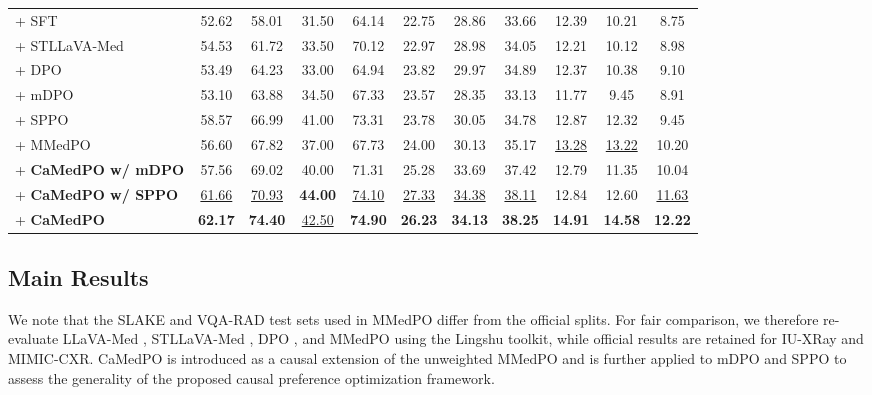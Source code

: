\begin{table}[t]
{\begin{tabular}{lcccccccccc}
\midrule
+ SFT & 52.62 & 58.01 & 31.50 & 64.14 & 22.75 & 28.86 & 33.66 & 12.39 & 10.21 & 8.75 \\
\quad+ STLLaVA-Med & 54.53 & 61.72 & 33.50 & 70.12 & 22.97 & 28.98 & 34.05 & 12.21 & 10.12 & 8.98 \\
\quad + DPO & 53.49 & 64.23 & 33.00 & 64.94 & 23.82 & 29.97 & 34.89 & 12.37 & 10.38 & 9.10 \\
\quad+ mDPO & 53.10 & 63.88 & 34.50 & 67.33 & 23.57 & 28.35 & 33.13 & 11.77 & 9.45 & 8.91 \\
\quad+ SPPO & 58.57 & 66.99 & 41.00 & 73.31 & 23.78 & 30.05 & 34.78 & 12.87 & 12.32 & 9.45 \\
\quad+ MMedPO & 56.60 & 67.82 & 37.00 & 67.73 & 24.00 & 30.13 & 35.17 & \underline{13.28} & \underline{13.22} & 10.20 \\
\rowcolor{cyan!7}
\quad+ \textbf{CaMedPO w/ mDPO} & 57.56 & 69.02 & 40.00 & 71.31 & 25.28 & 33.69 & 37.42 & 12.79 & 11.35 & 10.04 \\
\rowcolor{cyan!7}
\quad+ \textbf{CaMedPO w/ SPPO} & \underline{61.66} & \underline{70.93} & \textbf{44.00} & \underline{74.10} & \underline{27.33} & \underline{34.38} & \underline{38.11} & 12.84 & 12.60 & \underline{11.63} \\
\rowcolor{cyan!7}
\quad+ \textbf{CaMedPO} & \textbf{62.17} & \textbf{74.40} & \underline{42.50} & \textbf{74.90} & \textbf{26.23} & \textbf{34.13} & \textbf{38.25} & \textbf{14.91} & \textbf{14.58} & \textbf{12.22} \\
\bottomrule
\end{tabular}
}
\label{tab:main_results}
\end{table}

\subsection{Main Results}






We note that the SLAKE and VQA-RAD test sets used in MMedPO differ from the official splits. For fair comparison, we therefore re-evaluate LLaVA-Med \cite{Li2023LLaVAMed}, STLLaVA-Med \cite{sun2024stllava}, DPO \cite{rafailov2023direct}, and MMedPO \cite{Zhu2025MMedPO} using the Lingshu toolkit, while official results are retained for IU-XRay and MIMIC-CXR.
CaMedPO is introduced as a causal extension of the unweighted MMedPO and is further applied to mDPO \cite{wang2024mdpo} and SPPO \cite{wu2025selfplay} to assess the generality of the proposed causal preference optimization framework.




